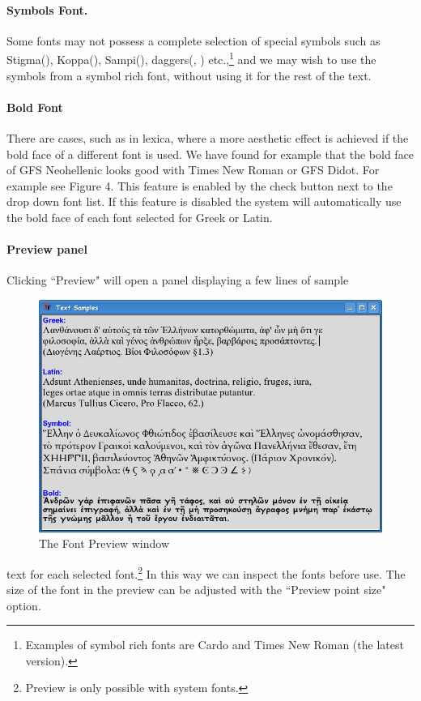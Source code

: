 \documentclass[11pt,a4paper]{article}
\newcommand{\gr}{\foreignlanguage{greek}}
\begin{document}
    \paragraph{Symbols Font.}Some fonts may not possess a complete selection
      of special symbols such as Stigma(\gr{\stigma}),
      Koppa(\gr{\qoppa}), Sampi(\gr{\sampi}), daggers(\dag, \ddag)
      etc.,\footnote{Examples of symbol rich fonts are
                     Cardo and Times New Roman (the latest version).}
      and we may wish to use the symbols from a symbol rich font,
      without using it for the rest of the text.
    \paragraph{Bold Font}There are cases, such as in lexica, where a more aesthetic
      effect is achieved if the bold face of a different font is used. We have
      found for example that the bold face of GFS Neohellenic looks good with
      Times New Roman or GFS Didot. For example see Figure 4.  This feature is
      enabled by the check button next to the drop down font list. If this feature is
      disabled the system will automatically use the bold face of each font selected for
      Greek or Latin.

    \paragraph{Preview panel}Clicking ``Preview" will open a panel displaying
      a few lines of sample
    \begin{figure}[htb]
      \begin{center}
        \includegraphics[scale=0.6]{../images/textsamples.png}
        \caption{The Font Preview window}
      \end{center}
    \end{figure}
      text for each selected font.\footnote{Preview is only possible with system fonts.}
      In this way we can inspect the fonts before use. The size of the font in the
      preview can be adjusted with the ``Preview point size" option.
\end{document}

